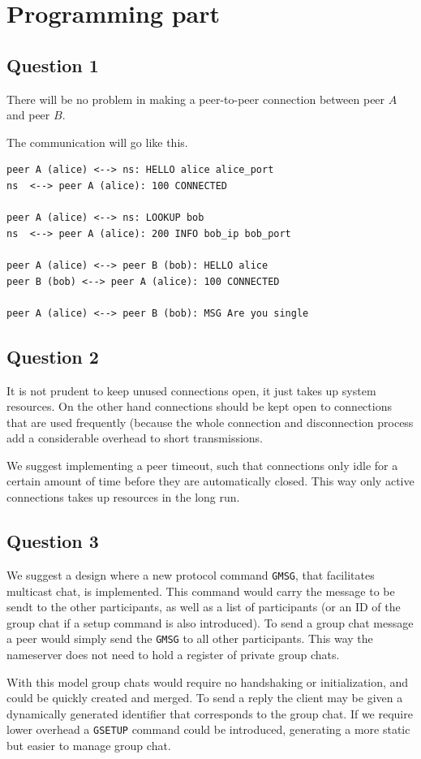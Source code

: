 \section{Programming part}
\subsection{Question 1}
There will be no problem in making a peer-to-peer connection between peer $A$
and peer $B$.

The communication will go like this.
\begin{lstlisting}
peer A (alice) <--> ns: HELLO alice alice_port
ns  <--> peer A (alice): 100 CONNECTED

peer A (alice) <--> ns: LOOKUP bob
ns  <--> peer A (alice): 200 INFO bob_ip bob_port

peer A (alice) <--> peer B (bob): HELLO alice
peer B (bob) <--> peer A (alice): 100 CONNECTED

peer A (alice) <--> peer B (bob): MSG Are you single
\end{lstlisting}

\subsection{Question 2}
It is not prudent to keep unused connections open, it just takes up system
resources. On the other hand connections should be kept open to connections
that are used frequently (because the whole connection and disconnection
process add a considerable overhead to short transmissions.

We suggest implementing a peer timeout, such that connections only idle for a
certain amount of time before they are automatically closed. This way only
active connections takes up resources in the long run.

\subsection{Question 3}
We suggest a design where a new protocol command {\tt GMSG}, that facilitates
multicast chat, is implemented. This command would carry the message to be sendt
to the other participants, as well as a list of participants (or an ID of the
group chat if a setup command is also introduced). To send a group chat message
a peer would simply send the {\tt GMSG} to all other participants. This way the
nameserver does not need to hold a register of private group chats.

With this model group chats would require no handshaking or initialization, and
could be quickly created and merged. To send a reply the client may be given a
dynamically generated identifier that corresponds to the group chat. If we require
lower overhead a {\tt GSETUP} command could be introduced, generating a more static
but easier to manage group chat.

